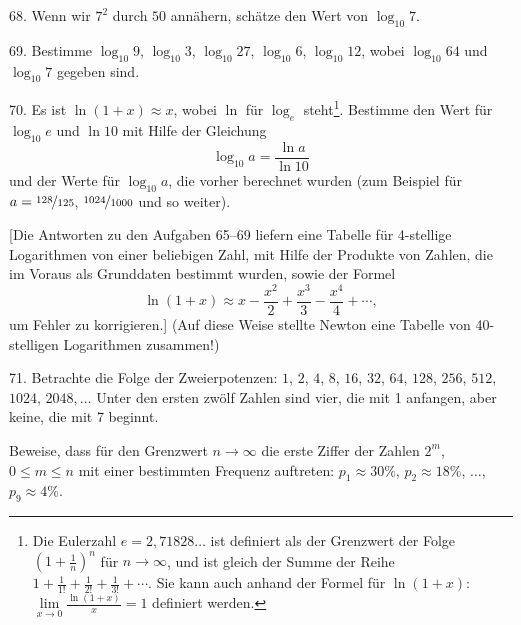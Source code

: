 \begin{problem}{68.}
	Wenn wir $7^2$ durch $50$ annähern, schätze den Wert von $\log_{10} 7$.
\end{problem}

\begin{problem}{69.}
	Bestimme $\log_{10} 9$, $\log_{10} 3$, $\log_{10} 27$, $\log_{10} 6$, $\log_{10} 12$, wobei $\log_{10} 64$ und $\log_{10} 7$ gegeben sind.
\end{problem}

\begin{problem}{70.}
	Es ist $\ln (1+x) \approx x$, wobei $\ln$ für $\log_e$ steht\footnote{Die Eulerzahl $e = 2{,}71828\dots$ ist definiert als der Grenzwert der Folge $\left(1+\frac1n\right)^n$ für $n\to \infty$, und ist gleich der Summe der Reihe 
	$1+\frac 1{1!} +\frac 1{2!}+\frac 1{3!}+\dotsb$. Sie kann auch anhand der Formel für $\ln (1+x)$: $\lim\limits_{x\to 0}\frac{\ln(1+x)}{x} = 1$ definiert werden.}. Bestimme den Wert für $\log_{10} e$ und $\ln 10$ mit Hilfe der Gleichung 
	\begin{equation*}
		\log_{10} a=\frac{\ln a}{\ln 10}
	\end{equation*} 
	und der Werte für $\log_{10} a$, die vorher berechnet wurden (zum Beispiel für $a=\nicefrac{128}{125}$, $\nicefrac{1024}{1000}$ und so weiter).
	
	[Die Antworten zu den Aufgaben 65--69 liefern eine Tabelle für 4-stellige Logarithmen von einer beliebigen Zahl, mit Hilfe der Produkte von Zahlen, die im Voraus als Grunddaten bestimmt wurden, sowie der Formel 
	\begin{equation*}
		\ln (1+x) \approx x-\frac{x^2}{2}+\frac{x^3}{3}-\frac{x^4}{4}+\dotsb,
	\end{equation*}
	um Fehler zu korrigieren.] (Auf diese Weise stellte Newton eine Tabelle von 40-stelligen Logarithmen zusammen!)
\end{problem}

\begin{problem}{71.}
	Betrachte die Folge der Zweierpotenzen: $1$, $2$, $4$, $8$, $16$, $32$, $64$, $128$, $256$, $512$, $1024$, $2048, \dotsc$ Unter den ersten zwölf Zahlen sind vier, die mit 1 anfangen, aber keine, die mit 7 beginnt. 

	Beweise, dass für den Grenzwert $n \to \infty$ die erste Ziffer der Zahlen $2^m$,
	$0\leqslant m \leqslant n$ mit einer bestimmten Frequenz auftreten: 
	$p_1 \approx 30\%$, $p_2 \approx 18\%$, $\dotsc$, $p_9 \approx 4\%$.
\end{problem}

